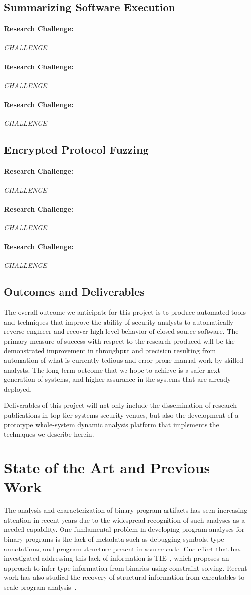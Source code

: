 \documentclass[letterpaper,twoside,11pt,headings=small]{scrartcl}
\newcommand{\challenge}[1]{\paragraph{Research Challenge:} \emph{#1}}
\begin{document}
\subsection{Summarizing Software Execution}
\label{sec:overview:autosummary}

\challenge{CHALLENGE}

\challenge{CHALLENGE}

\challenge{CHALLENGE}

\subsection{Encrypted Protocol Fuzzing}
\label{sec:overview:fuzzing}

\challenge{CHALLENGE}

\challenge{CHALLENGE}

\challenge{CHALLENGE}

\subsection{Outcomes and Deliverables}
\label{sec:overview:outcomes}

The overall outcome we anticipate for this project is to produce automated
tools and techniques that improve the ability of security analysts to
automatically reverse engineer and recover high-level behavior of
closed-source software.  The primary measure of success with respect to the
research produced will be the demonstrated improvement in throughput and
precision resulting from automation of what is currently tedious and
error-prone manual work by skilled analysts.  The long-term outcome that we
hope to achieve is a safer next generation of systems, and higher assurance in
the systems that are already deployed.

Deliverables of this project will not only include the dissemination of
research publications in top-tier systems security venues, but also the
development of a prototype whole-system dynamic analysis platform that
implements the techniques we describe herein.

\section{State of the Art and Previous Work}
\label{sec:related}

The analysis and characterization of binary program artifacts has seen
increasing attention in recent years due to the widespread recognition of such
analyses as a needed capability.  One fundamental problem in developing
program analyses for binary programs is the lack of metadata such as debugging
symbols, type annotations, and program structure present in source code.
One effort that has investigated addressing this lack of information is
TIE~\cite{lee:ndss2011:tie}, which proposes an approach to infer type
information from binaries using constraint solving.  Recent work has also
studied the recovery of structural information from executables to scale
program analysis~\cite{schwartz:2013:decomp}.
\end{document}
